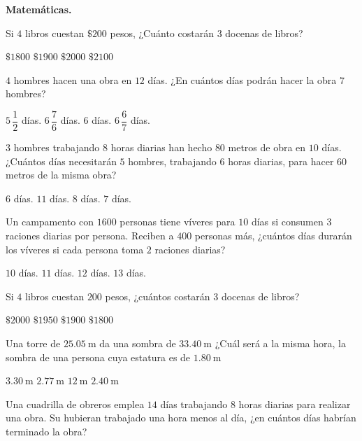 \documentclass[12pt]{exam}
\begin{document}
\textbf{Matemáticas.}
\begin{multicols}{2}
\begin{questions}
     \question Si $4$ libros cuestan $\$200$ pesos, ¿Cuánto costarán 3 docenas de libros?
     \begin{choices}
         \choice $\$1800$
         \choice $\$1900$
         \choice $\$2000$
         \choice $\$2100$
     \end{choices}
     \question $4$ hombres hacen una obra en $12$ días. ¿En cuántos días podrán hacer la obra $7$ hombres?
     \begin{choices}
        \choice $5 \, \dfrac{1}{2}$ días.
        \choice $6 \, \dfrac{7}{6}$ días.
        \choice $6$ días.
        \choice $6 \, \dfrac{6}{7}$ días.
    \end{choices}
    \question $3$ hombres trabajando $8$ horas diarias han hecho $80$ metros de obra en $10$ días. ¿Cuántos días necesitarán $5$ hombres, trabajando $6$ horas diarias, para hacer $60$ metros de la misma obra?
     \begin{choices}
        \choice $6$ días.
        \choice $11$ días.
        \choice $8$ días.
        \choice $7$ días.
    \end{choices}
    \question Un campamento con $1600$ personas tiene víveres para $10$ días si consumen $3$ raciones diarias por persona. Reciben a $400$ personas más, ¿cuántos días durarán los víveres si cada persona toma $2$ raciones diarias?
     \begin{choices}
        \choice $10$ días.
        \choice $11$ días.
        \choice $12$ días.
        \choice $13$ días.
    \end{choices}
    \question Si $4$ libros cuestan $200$ pesos, ¿cuántos costarán $3$ docenas de libros?
     \begin{choices}
        \choice $\$2000$ 
        \choice $\$1950$ 
        \choice $\$1900$ 
        \choice $\$1800$
    \end{choices}
    \question Una torre de $\SI{25.05}{\meter}$ da una sombra de $\SI{33.40}{\meter}$ ¿Cuál será a la misma hora, la sombra de una persona cuya estatura es de $\SI{1.80}{\meter}$
     \begin{choices}
        \choice $\SI{3.30}{\meter}$ 
        \choice $\SI{2.77}{\meter}$ 
        \choice $\SI{12}{\meter}$ 
        \choice $\SI{2.40}{\meter}$
    \end{choices}
    \question Una cuadrilla de obreros emplea $14$ días trabajando $8$ horas diarias para realizar una obra. Su hubieran trabajado una hora menos al día, ¿en cuántos días habrían terminado la obra?

\end{questions}
\end{multicols}
\end{document}

